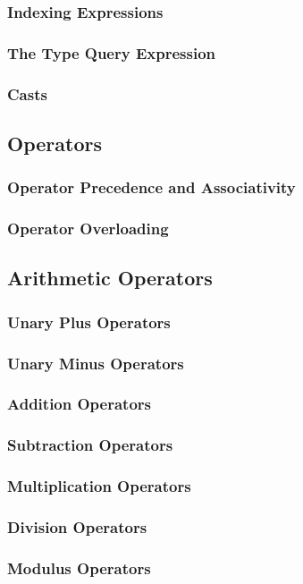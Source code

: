 \documentclass[10pt,twoside,titlepage]{article}
\begin{document}
\subsubsection{Indexing Expressions}
\subsubsection{The Type Query Expression}
\subsubsection{Casts}
\subsection{Operators}
\subsubsection{Operator Precedence and Associativity}
\subsubsection{Operator Overloading}
\subsection{Arithmetic Operators}
\subsubsection{Unary Plus Operators}
\subsubsection{Unary Minus Operators}
\subsubsection{Addition Operators}
\subsubsection{Subtraction Operators}
\subsubsection{Multiplication Operators}
\subsubsection{Division Operators}
\subsubsection{Modulus Operators}
\end{document}
